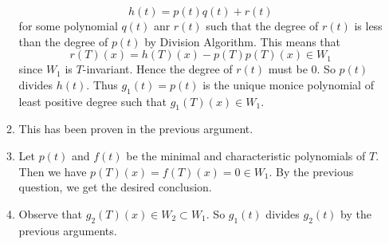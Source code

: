 \begin{enumerate}
\begin{enumerate}
\[h(t)=p(t)q(t)+r(t)\]
for some polynomial $q(t)$ anr $r(t)$ such that the degree of $r(t)$ is less than the degree of $p(t)$ by Division Algorithm. This means that 
\[r(T)(x)=h(T)(x)-p(T)p(T)(x)\in W_1\]
since $W_1$ is $T$-invariant. Hence the degree of $r(t)$ must be $0$. So $p(t)$ divides $h(t)$. Thus $g_1(t)=p(t)$ is the unique monice polynomial of least positive degree such that $g_1(T)(x)\in W_1$.
\item This has been proven in the previous argument.
\item Let $p(t)$ and $f(t)$ be the minimal and characteristic polynomials of $T$. Then we have $p(T)(x)=f(T)(x)=0\in W_1$. By the previous question, we get the desired conclusion.
\item Observe that $g_2(T)(x)\in W_2\subset W_1$. So $g_1(t)$ divides $g_2(t)$ by the previous arguments. 
\end{enumerate}
\end{enumerate}